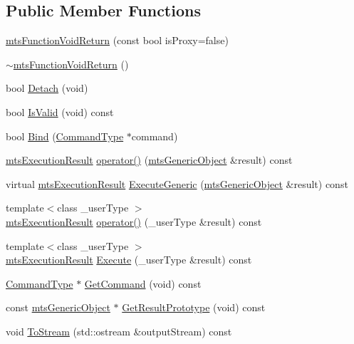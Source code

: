 \subsection*{Public Member Functions}
\begin{DoxyCompactItemize}
\item 
\hyperlink{classmts_function_void_return_ac88980814ca105a13e9e55f2cc58552e}{mts\-Function\-Void\-Return} (const bool is\-Proxy=false)
\item 
\hyperlink{classmts_function_void_return_ab86bbd4fba441a1ff0a722c7206c3e8b}{$\sim$mts\-Function\-Void\-Return} ()
\item 
bool \hyperlink{classmts_function_void_return_ab3bed9416ad22e74a269e1dd0dc07939}{Detach} (void)
\item 
bool \hyperlink{classmts_function_void_return_a179912ed4fd3487b9c274be8db16d822}{Is\-Valid} (void) const 
\item 
bool \hyperlink{classmts_function_void_return_af70fd93635a9e7ef6598f2a942687ab5}{Bind} (\hyperlink{classmts_function_void_return_a8aa3dea44f20057e4f47cbb20de87365}{Command\-Type} $\ast$command)
\item 
\hyperlink{classmts_execution_result}{mts\-Execution\-Result} \hyperlink{classmts_function_void_return_a20cb1b9dd5699e284c833b8d2a3cbca8}{operator()} (\hyperlink{classmts_generic_object}{mts\-Generic\-Object} \&result) const 
\item 
virtual \hyperlink{classmts_execution_result}{mts\-Execution\-Result} \hyperlink{classmts_function_void_return_a326e9b07fe307efd929ca04acf624459}{Execute\-Generic} (\hyperlink{classmts_generic_object}{mts\-Generic\-Object} \&result) const 
\item 
{\footnotesize template$<$class \-\_\-user\-Type $>$ }\\\hyperlink{classmts_execution_result}{mts\-Execution\-Result} \hyperlink{classmts_function_void_return_a96e91f6c4e5c36bc1e5b2c9ccb6dce07}{operator()} (\-\_\-user\-Type \&result) const 
\item 
{\footnotesize template$<$class \-\_\-user\-Type $>$ }\\\hyperlink{classmts_execution_result}{mts\-Execution\-Result} \hyperlink{classmts_function_void_return_a4c0db584b129d6306efa05f9ee54c2bb}{Execute} (\-\_\-user\-Type \&result) const 
\item 
\hyperlink{classmts_function_void_return_a8aa3dea44f20057e4f47cbb20de87365}{Command\-Type} $\ast$ \hyperlink{classmts_function_void_return_a8287972a864682bc1b94353ec747afc5}{Get\-Command} (void) const 
\item 
const \hyperlink{classmts_generic_object}{mts\-Generic\-Object} $\ast$ \hyperlink{classmts_function_void_return_acf66115c744df69c96b04f1c8c1c1d36}{Get\-Result\-Prototype} (void) const 
\item 
void \hyperlink{classmts_function_void_return_a7ed10b567427fe11d5b10cbb17f5e4fc}{To\-Stream} (std\-::ostream \&output\-Stream) const 
\end{DoxyCompactItemize}
